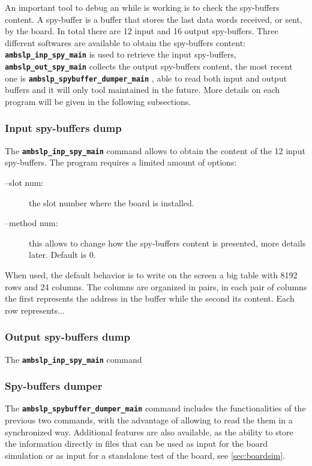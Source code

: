 An important tool to debug an \AMBoard while is working is to check the
spy-buffers content. A spy-buffer is a buffer that stores the last data words
received, or sent, by the board. In total there are 12 input and 16 output
spy-buffers. Three different softwares are available to obtain the spy-buffers
content: \textbf{\texttt{ambslp\_inp\_spy\_main}}
 is used to retrieve
the input spy-buffers, \textbf{\texttt{ambslp\_out\_spy\_main}}
collects the output spy-buffers content, 
the most recent one is 
\textbf{\texttt{ambslp\_spybuffer\_dumper\_main}}
, able to read
both input and output buffers and it will only tool maintained in the future.
More details on each program will be given in the following subsections.

\subsubsection{Input spy-buffers dump}

The \textbf{\texttt{ambslp\_inp\_spy\_main}}
command
allows to obtain the content of the 12 input spy-buffers. The program 
requires a limited amount of options:
\begin{description}
\item[--slot num:] the slot number where the board is installed.

\item[--method num:] this allows to change how the spy-buffers content is presented,
more details later. Default is 0.
\end{description}

When used, the default behavior is to write on the screen a big table with 8192 rows
and 24 columns. The columns are organized in pairs, in 
each pair of columns the first represents the address in the buffer while the second
its content. Each row represents...

\subsubsection{Output spy-buffers dump}
\label{sec:spyout}

The \textbf{\texttt{ambslp\_inp\_spy\_main}} command

\subsubsection{Spy-buffers dumper}
\label{sec:spydumper}

The \textbf{\texttt{ambslp\_spybuffer\_dumper\_main}}
 command includes
the functionalities of the previous two commands, with the advantage of allowing to
read the them in a synchronized way. Additional features are also available, as
the ability to store the information directly in files that can be used as input
for the board simulation or as input for a standalone test of the board, see
\ref{sec:boardsim}.